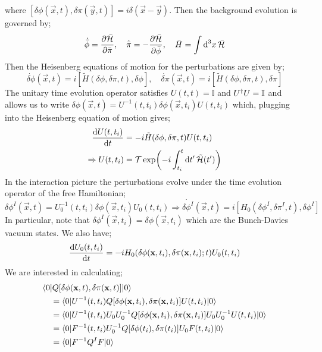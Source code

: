 where $\left[\delta \phi(\vec{x}, t), \delta \pi (\vec{y}, t)\right] = i \delta(\vec{x} - \vec{y})$. Then the background evolution is governed by;
\begin{equation*}
\dot{\bar{\phi}} = \frac{\partial \bar{\mathcal{H}}}{\partial \bar{\pi}} , \quad \dot{\bar{\pi}} = - \frac{\partial \bar{\mathcal{H}}}{\partial \bar{\phi}}, \quad \bar{H} = \int{\text{d}^3 x \, \bar{\mathcal{H}}}
\end{equation*}
Then the Heisenberg equations of motion for the perturbations are given by;
\begin{equation*}
\dot{\delta \phi}(\vec{x}, t) = i \left[\tilde{H}(\delta \phi, \delta \pi, t), \delta \phi\right], \quad \dot{\delta\pi}(\vec{x}, t) = i \left[\tilde{H}(\delta \phi, \delta \pi, t), \delta \pi\right]
\end{equation*}
The unitary time evolution operator satisfies $U(t, t) = \mathbb{I}$ and $U^{\dagger} U = \mathbb{I}$ and allows us to write $\delta \phi(\vec{x}, t) = U^{-1}(t, t_i) \delta\phi(\vec{x}, t_i)U(t, t_i)$ which, plugging into the Heisenberg equation of motion gives;
\begin{align*}
\frac{\ud U(t, t_i)}{\ud t} &= -i\tilde{H}(\delta \phi, \delta \pi, t) U(t, t_i) \\
\Rightarrow U(t, t_i) &= \mT \exp\left(-i \int_{t_i}^{t}{\upd{t\pr}\tilde{\hamilt}(t\pr)}\right)
\end{align*}
In the interaction picture the perturbations evolve under the time evolution operator of the free Hamiltonian;
\begin{equation*}
\delta \phi^{I}(\vec{x}, t) = U_0^{-1}(t, t_i) \delta\phi(\vec{x}, t_i) U_0(t, t_i) \Rightarrow \dot{\delta\phi^{I}}(\vec{x}, t) = i\left[H_0(\delta \phi^I, \delta \pi^I, t), \delta \phi^I\right]
\end{equation*}
In particular, note that $\delta \phi^{I}(\vec{x}, t_i) = \delta \phi(\vec{x}, t_i)$ which are the Bunch-Davies vacuum states. We also have;
\begin{equation*}
\frac{\ud U_0(t, t_i)}{\ud t} = -i H_0\left(\delta\phi(\vec{x}, t_i), \delta \pi(\vec{x}, t_i); t\right) U_0(t, t_i)
\end{equation*}
We are interested in calculating;
\begin{align*}
&\bra{0}Q[\delta \phi(\vec{x}, t), \delta\pi(\vec{x}, t)]\ket{0} \\
&\quad = \bra{0}U^{-1}(t, t_i)Q[\delta \phi(\vec{x}, t_i), \delta \pi(\vec{x}, t_i)]U(t, t_i) \ket{0} \\
&\quad = \bra{0}U^{-1}(t, t_i)U_0 U_0^{-1} Q[\delta \phi(\vec{x}, t_i), \delta \pi(\vec{x}, t_i)]U_0 U_0^{-1}U(t, t_i) \ket{0} \\
&\quad = \bra{0}F^{-1}(t, t_i)U_0^{-1}Q[\delta\phi(t_i), \delta\pi(t_i)] U_0 F(t, t_i)\ket{0} \\
&\quad = \bra{0}F^{-1} Q^{I} F\ket{0}
\end{align*}
